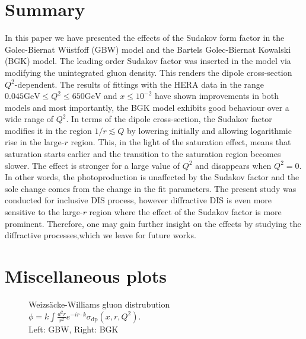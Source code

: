 \documentclass[11pt]{article}
\begin{document}
\section{Summary}
In this paper we have presented the effects of the Sudakov form factor in the Golec-Biernat W\"ustfoff (GBW) model and the Bartels Golec-Biernat Kowalski (BGK) model. 
The leading order Sudakov factor was inserted in the model via modifying the unintegrated gluon density. This renders the dipole cross-section $Q^2$-dependent.
The results of fittings with the HERA data in the range $0.045\mathrm{GeV} \leq Q^2 \leq 650\mathrm{GeV}$ and $x\leq 10^{-2}$ have shown improvements in both models and most importantly, the BGK model exhibits good behaviour over a wide range of $Q^2$.  In terms of the dipole cross-section, the Sudakov factor modifies it in the region $1/r\lesssim Q$ by lowering initially and allowing logarithmic rise in the large-$r$ region.  This, in the light of the saturation effect, means that saturation starts earlier and the transition to the saturation region becomes slower. The effect is stronger for a large value of $Q^2$ and disappears when $Q^2=0$. In other words, the photoproduction is unaffected by the Sudakov factor and the sole change comes from the change in the fit parameters. The present study was conducted for inclusive DIS process, however diffractive DIS is even more sensitive to the large-$r$ region where the effect of the Sudakov factor is more prominent. Therefore, one may gain further insight on the effects by studying the diffractive processes,which we leave for future works.


\printbibliography
\appendix
\section{Miscellaneous plots}





\begin{figure}[H]
\caption{Weizs\"acke-Williams gluon distrubution $\phi=k\int \frac{d^2r}{r^2} e^{-i r\cdot k} \sigma_{\mathrm{dp}}(x,r,Q^2)$.\\Left: GBW, Right: BGK
}
\end{figure}
\end{document}

